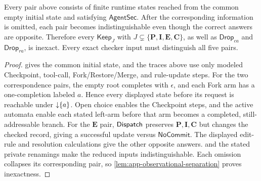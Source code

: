\begin{proposition}
\label{prop:app-explicit-pairs}
Every pair above consists of finite runtime states reached from the common empty initial state and satisfying \(\mathsf{AgentSec}\).
After the corresponding information is omitted, each pair becomes indistinguishable even though the correct answers are opposite.
Therefore every \(\mathsf{Keep}_J\) with \(J\subsetneq\{\mathbf P,\mathbf I,\mathbf E,\mathbf C\}\), as well as \(\mathsf{Drop}_{ca}\) and \(\mathsf{Drop}_{ra}\), is inexact.
Every exact checker input must distinguish all five pairs.
\end{proposition}

\begin{proof}
 gives the common initial state, and the traces above use only modeled Checkpoint, tool-call, Fork/Restore/Merge, and rule-update steps.
For the two correspondence pairs, the empty root completes with \(\epsilon\), and each Fork arm has a one-\Fresh completion labeled \(a\).
Hence every displayed state before its request is reachable under \(\mathord{\downarrow}\{a\}\).
Open choice enables the Checkpoint steps, and the active automata enable each stated left-arm \Fresh before that arm becomes a completed, still-addressable branch.
For the \(\mathbf E\) pair, \(\mathsf{Dispatch}\) preserves \(\mathbf P,\mathbf I,\mathbf C\) but changes the checked record, giving a successful update versus \(\mathsf{NoCommit}\).
The displayed edit-rule and resolution calculations give the other opposite answers.
 and the stated private renamings make the reduced inputs indistinguishable.
Each omission collapses its corresponding pair, so \cref{lem:app-observational-separation} proves inexactness.
\end{proof}

